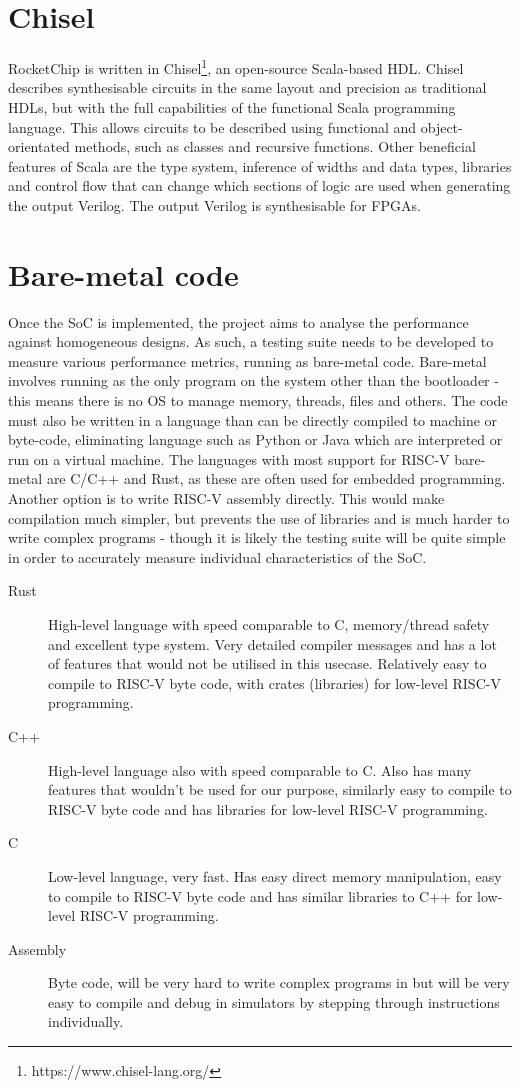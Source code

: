 \section{Chisel}
\label{chisel}
RocketChip is written in Chisel\footnote{https://www.chisel-lang.org/}, an open-source Scala-based HDL\cite{chisel}. Chisel describes synthesisable circuits in the same layout and precision as traditional HDLs, but with the full capabilities of the functional Scala programming language. This allows circuits to be described using functional and object-orientated methods, such as classes and recursive functions. Other beneficial features of Scala are the type system, inference of widths and data types, libraries and control flow that can change which sections of logic are used when generating the output Verilog. The output Verilog is synthesisable for FPGAs.

\section{Bare-metal code}
Once the SoC is implemented, the project aims to analyse the performance against homogeneous designs. As such, a testing suite needs to be developed to measure various performance metrics, running as bare-metal code. Bare-metal involves running as the only program on the system other than the bootloader - this means there is no OS to manage memory, threads, files and others. The code must also be written in a language than can be directly compiled to machine or byte-code, eliminating language such as Python or Java which are interpreted or run on a virtual machine. The languages with most support for RISC-V bare-metal are C/C++ and Rust, as these are often used for embedded programming. Another option is to write RISC-V assembly directly. This would make compilation much simpler, but prevents the use of libraries and is much harder to write complex programs - though it is likely the testing suite will be quite simple in order to accurately measure individual characteristics of the SoC.

\begin{description}
    \item[Rust] High-level language with speed comparable to C, memory/thread safety and excellent type system. Very detailed compiler messages and has a lot of features that would not be utilised in this usecase. Relatively easy to compile to RISC-V byte code, with crates (libraries) for low-level RISC-V programming.
    \item[C++] High-level language also with speed comparable to C. Also has many features that wouldn't be used for our purpose, similarly easy to compile to RISC-V byte code and has libraries for low-level RISC-V programming.
    \item[C] Low-level language, very fast. Has easy direct memory manipulation, easy to compile to RISC-V byte code and has similar libraries to C++ for low-level RISC-V programming.
    \item[Assembly] Byte code, will be very hard to write complex programs in but will be very easy to compile and debug in simulators by stepping through instructions individually.
\end{description}

